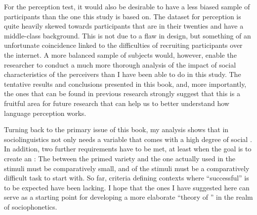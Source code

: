 For the perception test, it would also be desirable to have a less biased sample of participants than the one this study is based on.
The dataset for perception is quite heavily skewed towards participants that are in their twenties and have a middle-class background.
This is not due to a flaw in design, but something of an unfortunate coincidence linked to the difficulties of recruiting participants over the internet.
A more balanced sample of subjects would, however, enable the researcher to conduct a much more thorough analysis of the impact of social characteristics of the perceivers than I have been able to do in this study.
The tentative results and conclusions presented in this book, and, more importantly, the ones that can be found in previous research \parencite[cf.][]{hayetal2006a,haydrager2010} strongly suggest that this is a fruitful area for future research that can help us to better understand how language perception works.

Turning back to the primary issue of this book, my analysis shows that   in sociolinguistics not only needs a variable that comes with a high degree of social .
In addition, two further requirements have to be met, at least when the goal is to create an : 
The  between the primed variety and the one actually used in the stimuli must be comparatively small, and  of the stimuli must be a comparatively difficult task to start with.
So far, criteria defining contexts where ``successful''   is to be expected have been lacking.
I hope that the ones I have suggested here can serve as a starting point for developing a more elaborate ``theory of '' \parencite[cf.][]{cesario2014} in the realm of sociophonetics.